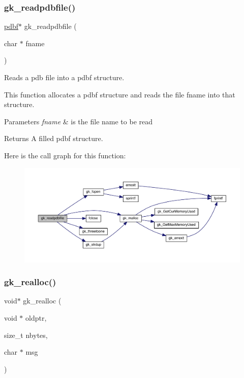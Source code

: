 \subsubsection{\texorpdfstring{gk\+\_\+readpdbfile()}{gk\_readpdbfile()}}
{\footnotesize\ttfamily \hyperlink{a00666}{pdbf}$\ast$ gk\+\_\+readpdbfile (\begin{DoxyParamCaption}\item[{char $\ast$}]{fname }\end{DoxyParamCaption})}



Reads a pdb file into a pdbf structure. 

This function allocates a pdbf structure and reads the file fname into that structure.


\begin{DoxyParams}{Parameters}
{\em fname} & is the file name to be read \\
\hline
\end{DoxyParams}
\begin{DoxyReturn}{Returns}
A filled pdbf structure. 
\end{DoxyReturn}
Here is the call graph for this function\+:\nopagebreak
\begin{figure}[H]
\begin{center}
\leavevmode
\includegraphics[width=350pt]{a00077_a297ec0561d579a1772f424fce8886d96_cgraph}
\end{center}
\end{figure}
\mbox{\label{a00077_ab76a07ccd25288dd9acc99f5f24a7600}} 
\subsubsection{\texorpdfstring{gk\+\_\+realloc()}{gk\_realloc()}}
{\footnotesize\ttfamily void$\ast$ gk\+\_\+realloc (\begin{DoxyParamCaption}\item[{void $\ast$}]{oldptr,  }\item[{size\+\_\+t}]{nbytes,  }\item[{char $\ast$}]{msg }\end{DoxyParamCaption})}

